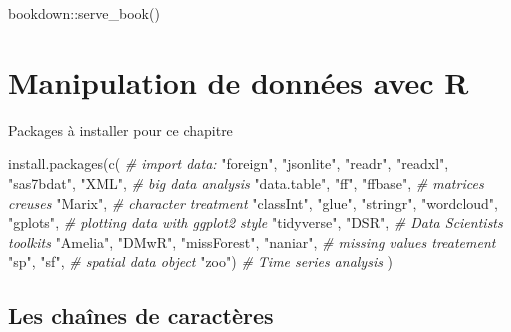 \documentclass[
]{book}
\newenvironment{Shaded}{\begin{snugshade}}{\end{snugshade}}
\newcommand{\CommentTok}[1]{\textcolor[rgb]{0.56,0.35,0.01}{\textit{#1}}}
\newcommand{\FunctionTok}[1]{\textcolor[rgb]{0.00,0.00,0.00}{#1}}
\newcommand{\NormalTok}[1]{#1}
\newcommand{\SpecialCharTok}[1]{\textcolor[rgb]{0.00,0.00,0.00}{#1}}
\newcommand{\StringTok}[1]{\textcolor[rgb]{0.31,0.60,0.02}{#1}}
\theoremstyle{definition}
\theoremstyle{definition}
\theoremstyle{definition}
\theoremstyle{definition}
\theoremstyle{remark}
\begin{document}
\begin{Shaded}
\begin{Highlighting}[]
\NormalTok{bookdown}\SpecialCharTok{::}\FunctionTok{serve\_book}\NormalTok{()}
\end{Highlighting}
\end{Shaded}

\hypertarget{manipulation-de-donnuxe9es-avec-r}{%
\chapter{\texorpdfstring{Manipulation de données avec \textbf{R}}{Manipulation de données avec R}}\label{manipulation-de-donnuxe9es-avec-r}}

Packages à installer pour ce chapitre

\begin{Shaded}
\begin{Highlighting}[]
\FunctionTok{install.packages}\NormalTok{(}\FunctionTok{c}\NormalTok{(}
  \CommentTok{\# import data:}
  \StringTok{"foreign"}\NormalTok{, }\StringTok{"jsonlite"}\NormalTok{, }\StringTok{"readr"}\NormalTok{, }\StringTok{"readxl"}\NormalTok{, }\StringTok{"sas7bdat"}\NormalTok{, }\StringTok{"XML"}\NormalTok{, }
  \CommentTok{\# big data analysis}
  \StringTok{"data.table"}\NormalTok{, }\StringTok{"ff"}\NormalTok{, }\StringTok{"ffbase"}\NormalTok{, }
  \CommentTok{\# matrices creuses}
  \StringTok{"Marix"}\NormalTok{, }
  \CommentTok{\# character treatment}
  \StringTok{"classInt"}\NormalTok{, }\StringTok{"glue"}\NormalTok{, }\StringTok{"stringr"}\NormalTok{, }\StringTok{"wordcloud"}\NormalTok{, }
  \StringTok{"gplots"}\NormalTok{, }\CommentTok{\# plotting data with ggplot2 style}
  \StringTok{"tidyverse"}\NormalTok{, }\StringTok{"DSR"}\NormalTok{, }\CommentTok{\# Data Scientists toolkits}
  \StringTok{"Amelia"}\NormalTok{, }\StringTok{"DMwR"}\NormalTok{, }\StringTok{"missForest"}\NormalTok{, }\StringTok{"naniar"}\NormalTok{,  }\CommentTok{\# missing values treatement}
  \StringTok{"sp"}\NormalTok{, }\StringTok{"sf"}\NormalTok{, }\CommentTok{\# spatial data object}
  \StringTok{"zoo"}\NormalTok{)  }\CommentTok{\# Time series analysis}
\NormalTok{)}
\end{Highlighting}
\end{Shaded}

\hypertarget{les-chauxeenes-de-caractuxe8res}{%
\section{Les chaînes de caractères}\label{les-chauxeenes-de-caractuxe8res}}
\end{document}
